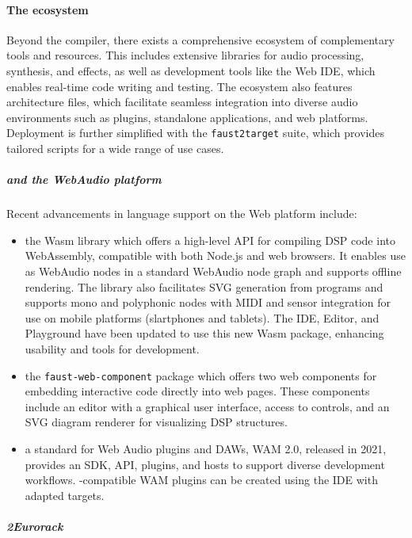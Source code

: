 \paragraph{The \F{} ecosystem}

Beyond the \F{} compiler, there exists a comprehensive ecosystem of complementary tools and resources. This includes
extensive libraries for audio processing, synthesis, and effects, as well as development tools like the \F{} Web IDE,
which enables real-time code writing and testing. The ecosystem also features \F{} architecture files, which facilitate seamless
integration into diverse audio environments such as plugins, standalone applications, and web platforms. Deployment is
further simplified with the \texttt{faust2target} suite, which provides tailored scripts for a wide range of use cases.

\subparagraph{\F{} and the WebAudio platform}

Recent advancements in \F{} language support on the Web platform include:

\begin{itemize}
\item
  the \F{}Wasm library which offers a high-level API for compiling \F{} DSP code into WebAssembly, compatible with both
  Node.js and web browsers. It enables use as WebAudio nodes in a standard WebAudio node graph and supports offline
  rendering. The library also facilitates SVG generation from \F{} programs and supports mono and polyphonic nodes with
  MIDI and sensor integration for use on mobile platforms (slartphones and tablets). The \F{} IDE, Editor, and
  Playground have been updated to use this new \F{}Wasm package, enhancing usability and tools for \F{} development.
\item
  the \texttt{faust-web-component} package which offers two web components for embedding interactive \F{} code directly
  into web pages. These components include an editor with a graphical user interface, access to controls, and an SVG
  diagram renderer for visualizing DSP structures.
\item
  a standard for Web Audio plugins and DAWs, WAM 2.0, released in 2021, provides an SDK, API, plugins, and hosts to
  support diverse development workflows. \F{}-compatible WAM plugins can be created using the \F{} IDE with adapted
  targets.
\end{itemize}

\subparagraph{\F{}2Eurorack}

